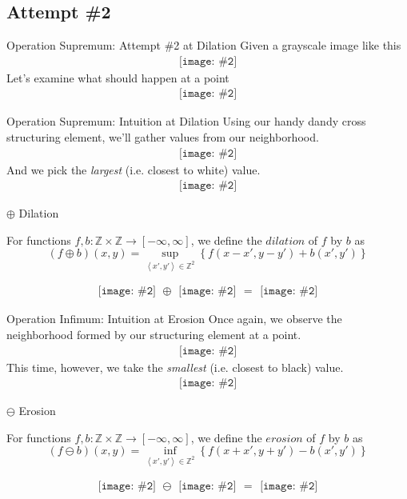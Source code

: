 \documentclass{beamer}
\newcommand{\pic}[2]{
     \begin{array}{l}
      \texttt{[image: \#2]}
      \end{array}
}
\newcommand{\set}[1]{\left\lbrace #1 \right\rbrace}
\newcommand{\tuple}[1]{\left\langle #1 \right\rangle}
\newcommand{\integers}{\mathbb{Z}}
\newcommand{\dilate}{\oplus}
\newcommand{\erode}{\ominus}
\begin{document}
\subsection{Attempt \#2}

\begin{frame}{Operation Supremum: Attempt \#2 at Dilation}
  Given a grayscale image like this
  $$\pic{width=50pt}{images/grayscale_tiles.png}$$  
  Let's examine what should happen at a point
  $$\pic{width=50pt}{images/grayscale_tiles_point.png}$$
\end{frame}

\begin{frame}{Operation Supremum: Intuition at Dilation}
  Using our handy dandy cross structuring element, we'll gather values from
  our neighborhood.
  $$\pic{width=50pt}{images/grayscale_tiles_neighborhood.png}$$  
  And we pick the \emph{largest} (i.e. closest to white) value.
  $$\pic{width=50pt}{images/grayscale_tiles_point_replacement.png}$$
\end{frame}

\begin{frame}{$\dilate$ Dilation}
\begin{definition}
  For functions $f,b: \mathbb{Z}\times\mathbb{Z}\rightarrow [-\infty,\infty]$,
  we define the $dilation$ of $f$ by $b$ as
  $$(f \dilate b)(x,y) = \displaystyle\sup_{\tuple{x',y'} \in \integers^2}
                                      \set{f(x-x',y-y') + b(x',y')}$$
\end{definition}
  $$\pic{width=50pt}{images/grayscale_tiles.png}
    \dilate \pic{width=50pt}{images/cross_inverted.png}
     = \pic{width=50pt}{images/grayscale_tiles_dilated.png}$$
\end{frame}

\begin{frame}{Operation Infimum: Intuition at Erosion}
  Once again, we observe the neighborhood formed by our structuring element
  at a point.
  $$\pic{width=50pt}{images/grayscale_tiles_neighborhood2.png}$$
  This time, however, we take the \emph{smallest} (i.e. closest to black)
  value.
  $$\pic{width=50pt}{images/grayscale_tiles_point_replacement2.png}$$
\end{frame}

\begin{frame}{$\erode$ Erosion}
\begin{definition}
  For functions $f,b: \mathbb{Z}\times\mathbb{Z}\rightarrow [-\infty,\infty]$,
  we define the $erosion$ of $f$ by $b$ as
  $$(f \erode b)(x,y) = \displaystyle\inf_{\tuple{x',y'} \in \integers^2}
                                      \set{f(x+x',y+y') - b(x',y')}$$
\end{definition}
$$\pic{width=50pt}{images/grayscale_tiles.png}
  \erode \pic{width=50pt}{images/cross_inverted.png}
  = \pic{width=50pt}{images/grayscale_tiles_eroded.png}$$
\end{frame}
\end{document}
